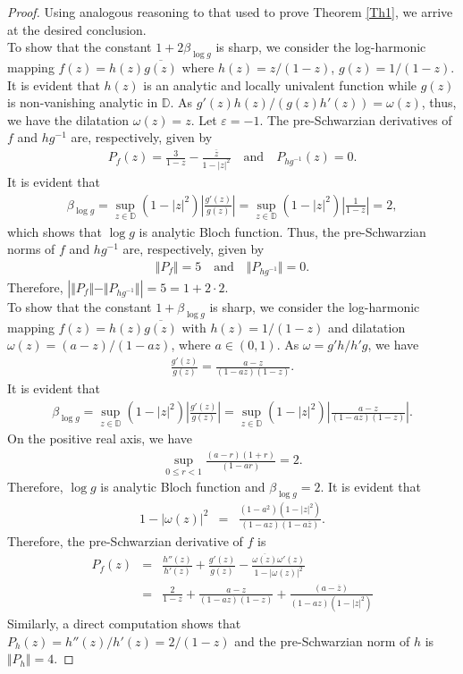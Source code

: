 \documentclass[10pt,a4paper]{amsart}
\newcommand{\beas}{\begin{eqnarray*}}
\newcommand{\eeas}{\end{eqnarray*}}
\newcommand{\ol}{\overline}
\renewcommand{\epsilon}{\varepsilon}
\begin{document}
\begin{proof} Using analogous reasoning to that used to prove \textrm{Theorem} \ref{Th1}, we arrive at the desired conclusion.\\[2mm]
\indent To show that the constant $1+2\beta_{\log g}$ is sharp, we consider the log-harmonic mapping $f(z)=h(z)\overline{g(z)}$ where $h(z)=z/(1-z)$, $g(z)=1/(1-z)$. It is 
evident that $h(z)$ is an analytic and locally univalent function while $g(z)$ is non-vanishing analytic in $\mathbb{D}$. As $g'(z)h(z)/(g(z)h'(z))=\omega(z)$, thus, we have the 
dilatation $\omega(z)=z$. Let $\epsilon=-1$. The pre-Schwarzian derivatives of $f$ and $hg^{-1}$ are, respectively, given by 
\beas
P_f(z)=\frac{3}{1-z}-\frac{\overline{z}}{1-|z|^2}\quad\text{and}\quad P_{hg^{-1}}(z)=0.\eeas
It is evident that
\beas
\beta_{\log{g}}=\sup_{z\in\mathbb{D}}(1-|z|^2)\left|\frac{g'(z)}{g(z)}\right|=\sup_{z\in\mathbb{D}}(1-|z|^2)\left|\frac{1}{1-z}\right|=2,\eeas
which shows that $\log{g}$ is analytic Bloch function. Thus, the pre-Schwarzian norms of $f$ and $hg^{-1}$ are, respectively, given by 
\beas
\Vert P_f\Vert=5\quad\text{and}\quad \Vert P_{hg^{-1}}\Vert=0.\eeas
Therefore, $\left|\Vert P_f\Vert-\Vert P_{hg^{-1}}\Vert\right|=5=1+2\cdot2$.\\[2mm]
\indent To show that the constant $1+\beta_{\log g}$ is sharp, we consider the log-harmonic mapping $f(z)=h(z)\overline{g(z)}$ with $h(z)=1/(1-z)$ and dilatation $\omega(z)=(a-z)/(1-az)$, where $a\in(0,1)$. As $\omega=g'h/h'g$, we have 
\beas \frac{g'(z)}{g(z)}=\frac{a-z}{(1-az)(1-z)}.\eeas
It is evident that
\beas
\beta_{\log{g}}=\sup_{z\in\mathbb{D}}(1-|z|^2)\left|\frac{g'(z)}{g(z)}\right|=\sup_{z\in\mathbb{D}}(1-|z|^2)\left|\frac{a-z}{(1-az)(1-z)}\right|.\eeas
On the positive real axis, we have 
\beas \sup_{0\leq r<1}\frac{(a-r)(1+r)}{(1-ar)}=2.\eeas
Therefore, $\log{g}$ is analytic Bloch function and $\beta_{\log{g}}=2$. It is evident that 
\beas 1-|\omega(z)|^2&=&\frac{(1-a^2)(1-|z|^2)}{(1-az)(1-a\ol{z})}.\eeas
Therefore, the pre-Schwarzian derivative of $f$ is 
\beas P_f(z)&=&\frac{h''(z)}{h'(z)}+\frac{g'(z)}{g(z)}-\frac{\overline{\omega(z)}\omega'(z)}{1-|\omega(z)|^2}\\[2mm]
&=&\frac{2}{1-z}+\frac{a-z}{(1-az)(1-z)}+\frac{(a-\ol{z})}{(1-az)(1-|z|^2)}\eeas
Similarly, a direct computation shows that $P_h(z)=h''(z)/h'(z)=2/(1-z)$ and the pre-Schwarzian norm of $h$ is $\Vert P_h\Vert=4$. 

\end{proof}
\end{document}
